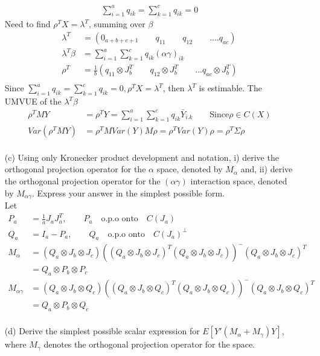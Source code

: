 \begin{itemize}
\begin{align*}
\sum_{i=1}^{a} q_{ik} = \sum_{k=1}^{c} q_{ik} =0
\end{align*} 
Need to find $\rho^T X = \lambda^T$, summing over $\beta$
\begin{align*}
\lambda^T &= (0_{a+b+c+1} \qquad q_{11} \qquad q_{12} \qquad .... q_{ac})\\
\lambda^T \beta &= \sum_{i=1}^{a} \sum_{k=1}^{c} q_{ik}(\alpha\gamma)_{ik}\\
\rho^T &= \frac{1}{b} (q_{11} \otimes J_b^T \qquad q_{12}  \otimes J_b^T \qquad ... q_{ac} \otimes J_b^T)\\
\end{align*} 
Since $\sum_{i=1}^{a} q_{ik} = \sum_{k=1}^{c} q_{ik} =0, \rho^T X = \lambda^T $, then $\lambda^T $ is estimable. 
The UMVUE of the $\lambda^T \beta$
\begin{align*}
\rho^T MY &= \rho^T Y = \sum_{i=1}^{a} \sum_{k=1}^{c} q_{ik} \bar{Y}_{i.k} \qquad \text{Since} \rho \in C(X)\\
Var(\rho^T MY) &= \rho^T M Var(Y)  M\rho = \rho^T Var(Y) \rho = \rho^T \Sigma \rho\\
\end{align*} 
\item[(c)] Using only Kronecker product development and notation, i) derive the orthogonal projection operator for the $\alpha$ space, denoted by $M_{\alpha}$ and, ii) derive the orthogonal
projection operator for the $(\alpha\gamma)$ interaction space, denoted by $M_{\alpha\gamma}$. Express your answer in the simplest possible form.\\
Let
\begin{align*}
P_a &= \frac{1}{a} J_a J_a^T, \qquad P_a \quad \text{o.p.o onto}\quad C(J_a)\\
Q_a &= I_a - P_a, \qquad Q_a \quad \text{o.p.o onto}\quad C(J_a)^{\perp}\\
M_{\alpha} &= (Q_a \otimes J_b \otimes J_c)\left ((Q_a \otimes J_b \otimes J_c)^T (Q_a \otimes J_b \otimes J_c) \right)^{-} (Q_a \otimes J_b \otimes J_c)^T\\
&= Q_a \otimes P_b \otimes P_c\\
M_{\alpha\gamma} &= (Q_a \otimes J_b \otimes Q_c) \left ((Q_a \otimes J_b \otimes Q_c)^T (Q_a \otimes J_b \otimes Q_c) \right)^{-} (Q_a \otimes J_b \otimes Q_c)^T\\
&= Q_a \otimes P_b \otimes Q_c\\
\end{align*} 
\item[(d)]Derive the simplest possible scalar expression for $E[Y'(M_{\alpha} + M_{\gamma})Y]$, where $M_{\gamma}$ denotes the orthogonal projection operator for the space.\\

\end{itemize}
